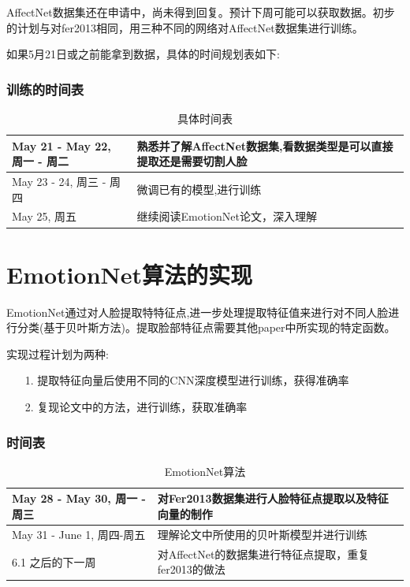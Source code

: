 \documentclass[11pt, a4paper]{article}
\begin{document}
AffectNet数据集还在申请中，尚未得到回复。预计下周可能可以获取数据。初步的计划与对fer2013相同，用三种不同的网络对AffectNet数据集进行训练。

如果5月21日或之前能拿到数据，具体的时间规划表如下:

\subsubsection{训练的时间表}

\begin{table}[htbp] 
	\begin{center}
		\caption{具体时间表}
		\begin{tabular}{|l|p{320pt}|} \hline
			May 21 - May 22, 周一 - 周二 & 熟悉并了解AffectNet数据集,看数据类型是可以直接提取还是需要切割人脸 \\ \hline
			May 23 - 24, 周三 - 周四 & 微调已有的模型,进行训练 \\ \hline
			May 25, 周五 & 继续阅读EmotionNet论文，深入理解 \\ \hline
		\end{tabular}
		\label{tab:table-2}
	\end{center}
\end{table}	


\section{EmotionNet算法的实现}

EmotionNet通过对人脸提取特特征点,进一步处理提取特征值来进行对不同人脸进行分类(基于贝叶斯方法)。提取脸部特征点需要其他paper中所实现的特定函数。

实现过程计划为两种:

\begin{itemize}
\item[1.] 提取特征向量后使用不同的CNN深度模型进行训练，获得准确率
\item[2.] 复现论文中的方法，进行训练，获取准确率
\end{itemize}

\subsubsection{时间表}

\begin{table}[htbp] 
	\begin{center}
		\caption{EmotionNet算法}
		\begin{tabular}{|l|p{320pt}|} \hline
			May 28 - May 30, 周一 - 周三 & 对Fer2013数据集进行人脸特征点提取以及特征向量的制作\\ \hline
			May 31 - June 1, 周四-周五 & 理解论文中所使用的贝叶斯模型并进行训练  \\ \hline
			6.1 之后的下一周 & 对AffectNet的数据集进行特征点提取，重复fer2013的做法 \\ \hline
		\end{tabular}
		\label{tab:table-3}
	\end{center}
\end{table}	
\end{document}
